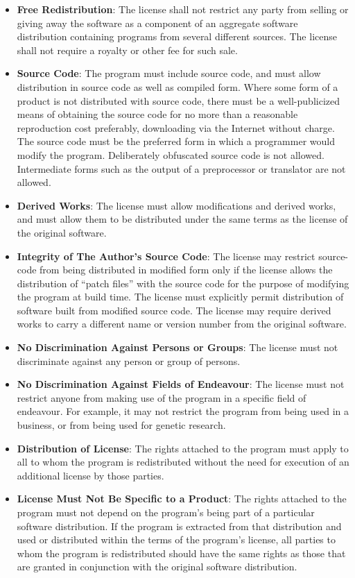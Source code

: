 \documentclass[]{book}
\begin{document}
\begin{itemize}
\item
  \textbf{Free Redistribution}: The license shall not restrict any party from selling or giving away the software as a component of an aggregate software distribution containing programs from several different sources. The license shall not require a royalty or other fee for such sale.
\item
  \textbf{Source Code}: The program must include source code, and must allow distribution in source code as well as compiled form. Where some form of a product is not distributed with source code, there must be a well-publicized means of obtaining the source code for no more than a reasonable reproduction cost preferably, downloading via the Internet without charge. The source code must be the preferred form in which a programmer would modify the program. Deliberately obfuscated source code is not allowed. Intermediate forms such as the output of a preprocessor or translator are not allowed.
\item
  \textbf{Derived Works}: The license must allow modifications and derived works, and must allow them to be distributed under the same terms as the license of the original software.
\item
  \textbf{Integrity of The Author's Source Code}: The license may restrict source-code from being distributed in modified form only if the license allows the distribution of ``patch files'' with the source code for the purpose of modifying the program at build time. The license must explicitly permit distribution of software built from modified source code. The license may require derived works to carry a different name or version number from the original software.
\item
  \textbf{No Discrimination Against Persons or Groups}: The license must not discriminate against any person or group of persons.
\item
  \textbf{No Discrimination Against Fields of Endeavour}: The license must not restrict anyone from making use of the program in a specific field of endeavour. For example, it may not restrict the program from being used in a business, or from being used for genetic research.
\item
  \textbf{Distribution of License}: The rights attached to the program must apply to all to whom the program is redistributed without the need for execution of an additional license by those parties.
\item
  \textbf{License Must Not Be Specific to a Product}: The rights attached to the program must not depend on the program's being part of a particular software distribution. If the program is extracted from that distribution and used or distributed within the terms of the program's license, all parties to whom the program is redistributed should have the same rights as those that are granted in conjunction with the original software distribution.

\end{itemize}
\end{document}
